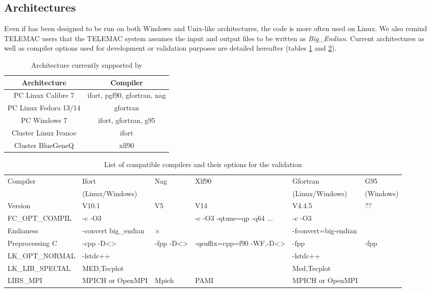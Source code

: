 \subsection{Architectures}
\label{prg_archi}%
Even if \estel has been designed to be run on both Windows and Unix-like architectures,
the code is more often used on Linux. We also remind TELEMAC users that the TELEMAC system assumes the input and output files to be written as \textit{Big\_Endian}.
Current architectures as well as compiler options used for development or validation purposes are detailed hereafter (tables \ref{tab_arch62} and \ref{tab_compilo62}).
\begin{table}[!h]
\begin{center}
\renewcommand{\arraystretch}{1.2}
\small
\begin {tabular} {c|c}
    \hline 
       Architecture &  Compiler \\
    \hline
    \hline 
PC Linux Calibre 7 & ifort, pgf90, gfortran, nag \\
PC Linux Fedora 13/14 & gfortran \\
PC Windows 7 & ifort, gfortran, g95 \\
Cluster Linux Ivanoe & ifort \\
Cluster BlueGeneQ & xlf90 \\
\end {tabular}
\normalsize
\caption{Architecture currently supported by \estel \rel}\label{tab_arch62}
\end{center}
\end{table}
% 
\begin{table}[!h]
\begin{center}
\renewcommand{\arraystretch}{1.2}
\tiny
\begin {tabular} {l|l|l|l|l|l}
    \hline    
    Compiler      & Ifort          & Nag & Xlf90 & Gfortran       & G95 \\
                  & (Linux/Windows)&  &  & (Linux/Windows) & (Windows) \\
    \hline
    \hline  
    Version       & V10.1 & V5 & V14 & V4.4.5 & ?? \\
 FC\_OPT\_COMPIL  & -c -O3 & & -c -O3 -qtune=qp -q64 ... & -c -O3  \\
 Endianess        & -convert big\_endian & $\times$ & & -fconvert=big-endian \\
 Preprocessing C  & -cpp -D<>& -fpp -D<> & -qsuffix=cpp=f90 -WF,-D<> & -fpp & -fpp \\
 LK\_OPT\_NORMAL  & -lstdc{\tiny ++} & & &-lstdc{\tiny ++} &\\
 LK\_LIB\_SPECIAL & MED,Tecplot & & & Med,Tecplot & \\
  LIBS\_MPI       & MPICH or OpenMPI &  Mpich & PAMI & MPICH or OpenMPI \\
    \hline  
  \end {tabular}                  
\normalsize
\caption{List of \estel compatible compilers and their options for the \estel \rel validation}\label{tab_compilo62}
\end{center}
\end{table}

